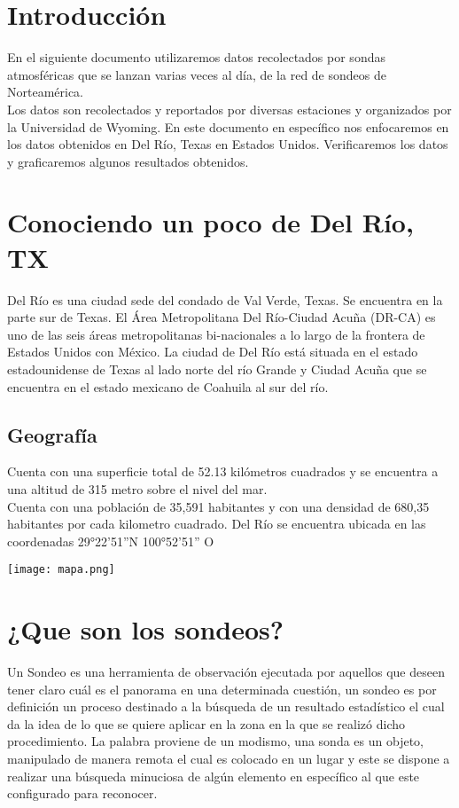 \documentclass[12pt,letterpaper]{article}
\begin{document}
\begin{portada}
\section{Introducción}

En el siguiente documento utilizaremos datos recolectados por sondas atmosféricas que se lanzan varias veces al día, de la red de sondeos de Norteamérica.\\
Los datos son recolectados y reportados por diversas estaciones y organizados por la Universidad de Wyoming. En este documento en específico nos enfocaremos en los datos obtenidos en Del Río, Texas en Estados Unidos. Verificaremos los datos y graficaremos algunos resultados obtenidos.

\section{Conociendo un poco de Del Río, TX}
Del Río es una ciudad sede del condado de Val Verde, Texas. Se encuentra en la parte sur de Texas. El Área Metropolitana Del Río-Ciudad Acuña (DR-CA) es uno de las seis áreas metropolitanas bi-nacionales a lo largo de la frontera de Estados Unidos con México. La ciudad de Del Río está situada en el estado estadounidense de Texas al lado norte del río Grande y Ciudad Acuña que se encuentra en el estado mexicano de Coahuila al sur del río.
\subsection{Geografía}
Cuenta con una superficie total de 52.13 kilómetros cuadrados y se encuentra a una altitud de 315 metro sobre el nivel del mar. \\
Cuenta con una población de 35,591 habitantes y con una densidad de 680,35 habitantes por cada kilometro cuadrado. Del Río se encuentra ubicada en las coordenadas 29°22'51''N 100°52'51'' O

\begin{center}
\texttt{[image: mapa.png]}
\end{center}

\section{¿Que son los sondeos?}
Un Sondeo es una herramienta de observación ejecutada por aquellos que deseen tener claro cuál es el panorama en una determinada cuestión, un sondeo es por definición un proceso destinado a la búsqueda de un resultado estadístico el cual da la idea de lo que se quiere aplicar en la zona en la que se realizó dicho procedimiento. La palabra proviene de un modismo, una sonda es un objeto, manipulado de manera remota el cual es colocado en un lugar y este se dispone a realizar una búsqueda minuciosa de algún elemento en específico al que este configurado para reconocer.


\end{portada}
\end{document}
